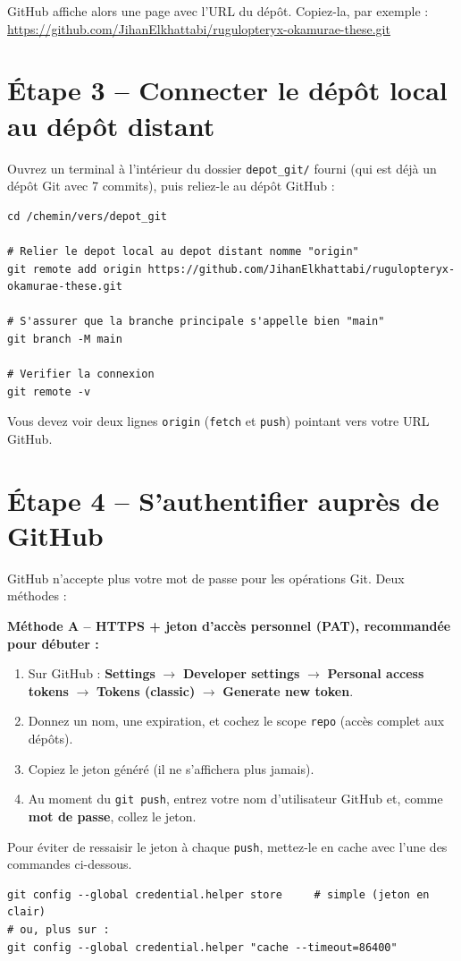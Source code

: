 \documentclass[11pt,a4paper]{article}
\begin{document}
GitHub affiche alors une page avec l'URL du dépôt. Copiez-la, par exemple :
\url{https://github.com/JihanElkhattabi/rugulopteryx-okamurae-these.git}

\section{Étape 3 -- Connecter le dépôt local au dépôt distant}
Ouvrez un terminal à l'intérieur du dossier \texttt{depot\_git/} fourni (qui est déjà
un dépôt Git avec 7 commits), puis reliez-le au dépôt GitHub :

\begin{lstlisting}
cd /chemin/vers/depot_git

# Relier le depot local au depot distant nomme "origin"
git remote add origin https://github.com/JihanElkhattabi/rugulopteryx-okamurae-these.git

# S'assurer que la branche principale s'appelle bien "main"
git branch -M main

# Verifier la connexion
git remote -v
\end{lstlisting}

Vous devez voir deux lignes \texttt{origin} (\texttt{fetch} et \texttt{push}) pointant
vers votre URL GitHub.

\section{Étape 4 -- S'authentifier auprès de GitHub}
GitHub n'accepte plus votre mot de passe pour les opérations Git. Deux méthodes :

\textbf{Méthode A -- HTTPS + jeton d'accès personnel (PAT), recommandée pour débuter :}
\begin{enumerate}
  \item Sur GitHub : \textbf{Settings} $\rightarrow$ \textbf{Developer settings}
        $\rightarrow$ \textbf{Personal access tokens} $\rightarrow$ \textbf{Tokens (classic)}
        $\rightarrow$ \textbf{Generate new token}.
  \item Donnez un nom, une expiration, et cochez le scope \texttt{repo} (accès complet
        aux dépôts).
  \item Copiez le jeton généré (il ne s'affichera plus jamais).
  \item Au moment du \texttt{git push}, entrez votre nom d'utilisateur GitHub et,
        comme \textbf{mot de passe}, collez le jeton.
\end{enumerate}

\begin{astuce}
Pour éviter de ressaisir le jeton à chaque \texttt{push}, mettez-le en cache avec
l'une des commandes ci-dessous.
\end{astuce}
\begin{lstlisting}
git config --global credential.helper store     # simple (jeton en clair)
# ou, plus sur :
git config --global credential.helper "cache --timeout=86400"
\end{lstlisting}
\end{document}
